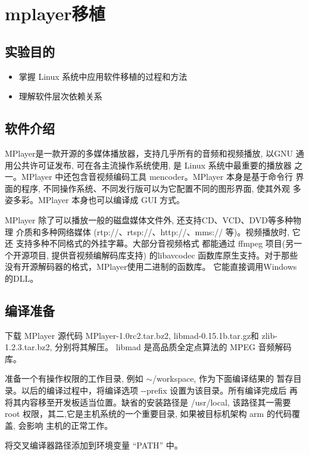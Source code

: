 \chapter{mplayer移植}

\section{实验目的}
\begin{itemize}\itemsep=-3pt
  \item 掌握 Linux 系统中应用软件移植的过程和方法
  \item 理解软件层次依赖关系
\end{itemize}

\section{软件介绍}

	MPlayer是一款开源的多媒体播放器，支持几乎所有的音频和视频播放, 以GNU
通用公共许可证发布, 可在各主流操作系统使用, 是 Linux 系统中最重要的播放器
之一。MPlayer 中还包含音视频编码工具 mencoder。MPlayer 本身是基于命令行
界面的程序, 不同操作系统、不同发行版可以为它配置不同的图形界面, 使其外观
多姿多彩。MPlayer 本身也可以编译成 GUI 方式。

	MPlayer 除了可以播放一般的磁盘媒体文件外, 还支持CD、VCD、DVD等多种物理
介质和多种网络媒体 (rtp://、rtsp://、http://、mms:// 等)。视频播放时, 它还
支持多种不同格式的外挂字幕。大部分音视频格式
都能通过 ffmpeg 项目(另一个开源项目, 提供音视频编解码库支持) 的libavcodec
函数库原生支持。对于那些没有开源解码器的格式，MPlayer使用二进制的函数库。
它能直接调用Windows的DLL。

\section{编译准备}

	下载 MPlayer 源代码 MPlayer-1.0rc2.tar.bz2, libmad-0.15.1b.tar.gz和
 zlib-1.2.3.tar.bz2, 分别将其解压。
 libmad 是高品质全定点算法的 MPEG 音频解码库。

	准备一个有操作权限的工作目录, 例如 $\sim$/workspace, 作为下面编译结果的
暂存目录。以后的编译过程中，将编译选项 -{}-prefix 设置为该目录。所有编译完成后
再将其内容移至开发板适当位置。缺省的安装路径是 /usr/local, 该路径其一需要root
权限，其二,它是主机系统的一个重要目录, 如果被目标机架构 arm 的代码覆盖, 会影响
主机的正常工作。

	将交叉编译器路径添加到环境变量 ``PATH'' 中。

